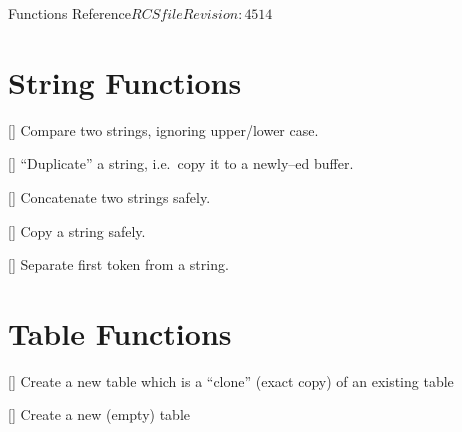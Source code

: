 \begin{cactuspart}{ Functions Reference}{$RCSfile$}{$Revision: 4514 $}
\begin{Lentry}


\end{Lentry}


\section{String Functions}

\begin{Lentry}

\item[\code{Util\_StrCmpi}]
     [\pageref{Util-StrCmpi}]
Compare two strings, ignoring upper/lower case.

\item[\code{Util\_Strdup}]
     [\pageref{Util-Strdup}]
``Duplicate'' a string,
i.e.\ copy it to a newly--ed buffer.

\item[\code{Util\_Strlcat}]
     [\pageref{Util-Strlcat}]
Concatenate two strings safely.

\item[\code{Util\_Strlcpy}]
     [\pageref{Util-Strlcpy}]
Copy a string safely.

\item[\code{Util\_StrSep}]
     [\pageref{Util-StrSep}]
Separate first token from a string.

\end{Lentry}


\section{Table Functions}

\begin{Lentry}

\item[\code{Util\_TableClone}]
     [\pageref{Util-TableClone}]
Create a new table which is a ``clone'' (exact copy) of an existing
table

\item[\code{Util\_TableCreate}]
     [\pageref{Util-TableCreate}]
Create a new (empty) table


\end{Lentry}
\end{cactuspart}
